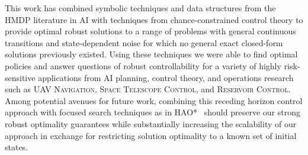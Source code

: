 %
%

This work has combined symbolic techniques and data structures from
the HMDP literature in AI with techniques from chance-constrained
control theory to provide optimal robust solutions to a range of
problems with general continuous transitions and state-dependent noise
for which no general exact closed-form solutions previously existed.
Using these techniques we were able to find optimal policies and
answer questions of robust controllability for a variety of highly
risk-sensitive applications from AI planning, control theory, and
operations research such as \textsc{UAV Navigation}, \textsc{Space
  Telescope Control}, and \textsc{Reservoir Control}.  Among 
potential avenues for future work, combining this receding horizon
control approach with focused search techniques as in HAO*~\cite{hao09}
should preserve our strong robust optimality guarantees while
substantially increasing the scalability of our approach in exchange
for restricting solution optimality to a known set of initial states.
